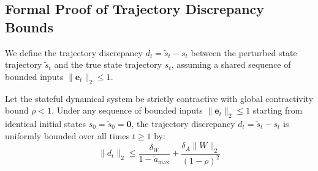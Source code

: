\subsection{Formal Proof of Trajectory Discrepancy Bounds}
We define the trajectory discrepancy $d_t = \tilde{s}_t - s_t$ between the perturbed state trajectory $\tilde{s}_t$ and the true state trajectory $s_t$, assuming a shared sequence of bounded inputs $\|\mathbf{e}_t\|_2 \le 1$.

\begin{theorem}
Let the stateful dynamical system be strictly contractive with global contractivity bound $\rho < 1$. Under any sequence of bounded inputs $\|\mathbf{e}_t\|_2 \le 1$ starting from identical initial states $s_0 = \tilde{s}_0 = \mathbf{0}$, the trajectory discrepancy $d_t = \tilde{s}_t - s_t$ is uniformly bounded over all times $t \ge 1$ by:
\begin{equation}
    \|d_t\|_2 \le \frac{\delta_W}{1 - \tilde{a}_{\max}} + \frac{\delta_A \|W\|_2}{(1 - \rho)^2}
\end{equation}
\end{theorem}

